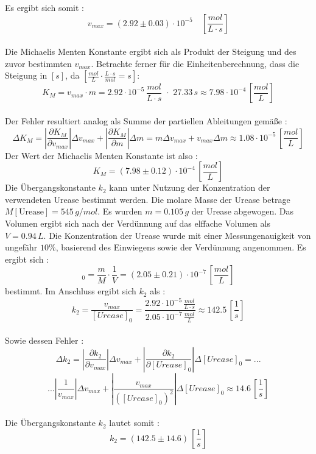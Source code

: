 Es ergibt sich somit : 
\begin{equation}
v_{max} = (2.92 \pm 0.03 )\cdot 10^{-5}  \quad \left[\si{\frac{mol}{L\cdot s}}\right]
\end{equation}\\
Die Michaelis Menten Konstante ergibt sich als Produkt der Steigung und des zuvor bestimmten $v_{max}$. Betrachte ferner für die Einheitenberechnung, dass die Steigung in $  [\si{s}]$, da $ [\si{\frac{mol}{L}\cdot \frac{L\cdot s}{mol} = s}]$: 
\begin{equation}
K_M = v_{max} \cdot m = 2.92 \cdot 10^{-5} \, \si{\frac{mol}{L\cdot s}}\,\, \cdot \,\,27.33  \,\si{s} \approx 7.98 \cdot 10^{-4} \, \left[\si{\frac{mol}{L}}\right]
\end{equation}\\
Der Fehler resultiert analog als Summe der partiellen Ableitungen gemäße : 
\begin{equation}
\Delta K_M = |\frac{\partial K_M}{\partial v_{max}}|\Delta v_{max} + |\frac{\partial K_M}{\partial m}|\Delta m  = m \Delta v_{max} + v_{max}\Delta m \approx 1.08 \cdot 10^{-5} \,\left[\si{\frac{mol}{L}}\right]
\end{equation}
Der Wert der Michaelis Menten Konstante ist also : 
\begin{equation}
K_M = (7.98 \pm 0.12) \cdot 10^{-4} \,\left[\si{\frac{mol}{L}}\right]
\end{equation}
Die Übergangskonstante $k_2$ kann unter Nutzung der Konzentration der verwendeten Urease bestimmt werden. Die molare Masse der Urease betrage $M[\text{Urease}] = 545 \, \si{g/mol} $. Es wurden $m = 0.105\,\si{g}$ der Urease abgewogen. Das Volumen ergibt sich nach der Verdünnung auf das elffache Volumen als $V=0.94\,\si{L}$. Die Konzentration der Urease wurde mit einer Messungenauigkeit von ungefähr $10\%$, basierend des Einwiegens sowie der Verdünnung angenommen. Es ergibt sich :
\begin{equation}
[Urease]_0 = \frac{m}{M}\cdot \frac{1}{V} =  (2.05 \pm 0.21)\cdot 10^{-7} \,\left[\si{\frac{mol}{L}}\right]
\end{equation} 
bestimmt. Im Anschluss ergibt sich $k_2$ als : 
\begin{equation}
k_2 = \frac{v_{max}}{[Urease]_0} = \frac{2.92\cdot 10^{-5}\, \si{\frac{mol}{L\cdot s}}}{2.05 \cdot 10^{-7} \, \si{\frac{mol}{L}}} \approx 142.5 \, \left[\si{\frac{1}{s}}\right]
\label{eq:k2}
\end{equation}
\\
Sowie dessen Fehler : 
\begin{equation}
\Delta k_2 = \left|\frac{\partial k_2}{\partial v_{max}}\right|\Delta v_{max} + \left|\frac{\partial k_2}{\partial [Urease]_0}\right|\Delta [Urease]_0  = ...
\end{equation}
\begin{equation*}
... \left|\frac{1}{v_{max}}\right| \Delta v_{max} + \left|\frac{v_{max}}{([Urease]_0)^2}\right|\Delta [Urease]_0 \approx 14.6 \,\left[\si{\frac{1}{s}}\right]
\end{equation*}
\\
Die Übergangskonstante $k_2$ lautet somit : 
\begin{equation}
k_2 = (142.5 \pm 14.6)\,\left[\si{\frac{1}{s}}\right]
\end{equation}
%